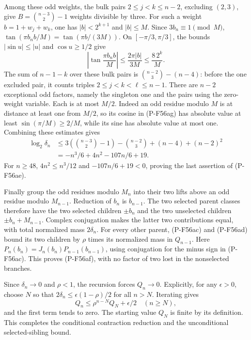 Among these odd weights, the bulk pairs
$2\le j<k\le n-2$, excluding $(2,3)$,
give
$B=\binom{n-3}2-1$ weights divisible by three.
For such a weight $b=1+w_j+w_k$, one has
$|b|<2^{k+1}$ and $|b|\le M$.
Since $3b_n\equiv1\pmod M$,
$\tan(\pi b_n b/M)=\tan(\pi b/(3M))$.
On $[-\pi/3,\pi/3]$, the bounds
$|\sin u|\le|u|$ and $\cos u\ge1/2$ give
\[
 \left|\tan\frac{\pi b_n b}{M}\right|
       \le\frac{2\pi |b|}{3M}
       \le\frac{8\,2^k}{M}.
 \tag{P-F56ah}
\]
The sum of $n-1-k$ over these bulk pairs is
$\binom{n-2}3-(n-4)$: before the one excluded pair,
it counts triples $2\le j<k<\ell\le n-1$.
There are $n-2$ exceptional odd factors, namely the
singleton one and the pairs using the zero-weight
variable. Each is at most $M/2$.
Indeed an odd residue modulo $M$ is at distance at least
one from $M/2$, so its cosine in (P-F56ag) has absolute
value at least $\sin(\pi/M)\ge2/M$, while its sine has
absolute value at most one.
Combining these estimates gives
\[
 \begin{split}
 \log_2\delta_n
 &\le 3\left(\binom{n-3}2-1\right)
        -\binom{n-2}3+(n-4)+(n-2)^2\\
 &=-n^3/6+4n^2-107n/6+19 .
 \end{split}
 \tag{P-F56ai}
\]
For $n\ge48$, $4n^2\le n^3/12$ and
$-107n/6+19<0$, proving the last assertion of
(P-F56ae).

Finally group the odd residues modulo $M_n$ into their
two lifts above an odd residue modulo $M_{n-1}$.
Reduction of $b_n$ is $b_{n-1}$.
The two selected parent classes therefore have the two
selected children $\pm b_n$ and the two unselected
children $\pm b_n+M_{n-1}$.
Complex conjugation makes the latter two contributions
equal, with total normalized mass $2\delta_n$.
For every other parent, (P-F56ac) and (P-F56ad)
bound its two children by $\rho$ times its normalized
mass in $Q_{n-1}$.
Here
$P_n(b_n)=J_n(b_n)P_{n-1}(b_{n-1})$,
using conjugation for the minus sign in (P-F56ac).
This proves (P-F56af), with no factor of two lost
in the nonselected branches.

Since $\delta_n\to0$ and $\rho<1$, the recursion forces
$Q_n\to0$. Explicitly, for any $\epsilon>0$, choose
$N$ so that $2\delta_n\le\epsilon(1-\rho)/2$
for all $n>N$. Iterating gives
\[
 Q_n\le \rho^{n-N}Q_N+\epsilon/2
                  \quad(n\ge N),
 \tag{P-F56aj}
\]
and the first term tends to zero.
The starting value $Q_N$ is finite by its definition.
This completes the conditional contraction reduction
and the unconditional selected-sibling bound.


